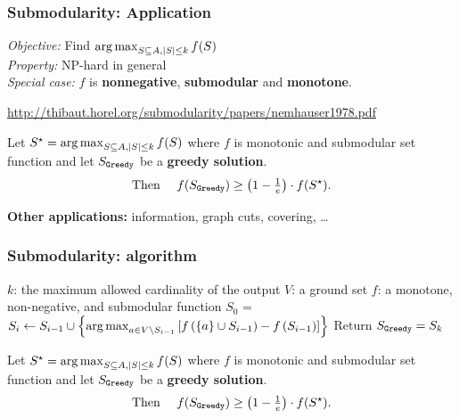 \documentclass{beamer}
\begin{document}
\begin{frame}
\frametitle{Submodularity: Application} 
\bskip

\textit{Objective:} Find $\operatorname*{arg\,max}_{S\subseteq A, |S|\leq k} f(S)$\\
\smallskip
\pause
\textit{Property:} NP-hard in general\\
\smallskip
\textit{Special case:} $f$ is  \textbf{nonnegative}, \textbf{submodular} and \textbf{monotone}.


\pause
{\tiny \flushright \url{http://thibaut.horel.org/submodularity/papers/nemhauser1978.pdf}}

\begin{block}{}%
Let $S^\star = \operatorname*{arg\,max}_{S\subseteq A, |S|\leq k} f(S)$ where $f$
is monotonic and submodular set function
and let $S_{\texttt{Greedy}}$ be a \textbf{greedy solution}. 
\[
 \text{Then \quad} f(S_{\texttt{Greedy}}) \geq \left(1-\tfrac{1}{e}\right)\cdot f(S^\star).
\]
\end{block}

\pause
\textbf{Other applications:} information, graph cuts, covering, \dots
\end{frame}

\begin{frame}
\frametitle{Submodularity:  \greedy algorithm}  
 \begin{algorithmic}[1]
{\footnotesize
  \STATE \quad $k$: the maximum allowed cardinality of the output
  \STATE \quad $V$: a ground set 
  \STATE \quad $f$: a monotone, non-negative, and submodular function
  \STATE  $S_0$ = \emptyset
\STATE  \alert<0>{$S_i \gets S_{i-1} \cup \left\{ \operatorname*{arg\,max}_{a \in V \setminus S_{i-1} }  \left[ f\left(\left\{ a \right\} \cup S_{i-1} \right)  - f\left( S_{i-1}\right)  \right]\right\}$}
\ENDFOR
 \STATE  \quad Return $S_{\texttt{Greedy}} = S_k$
}
\begin{block}{}%
Let $S^\star = \operatorname*{arg\,max}_{S\subseteq A, |S|\leq k} f(S)$ where $f$
is monotonic and submodular set function
and let $S_{\texttt{Greedy}}$ be a \textbf{greedy solution}. 
\[
 \text{Then \quad} f(S_{\texttt{Greedy}}) \geq \left(1-\tfrac{1}{e}\right)\cdot f(S^\star).
\]
\end{block}
\end{algorithmic}
\end{frame}
\end{document}
